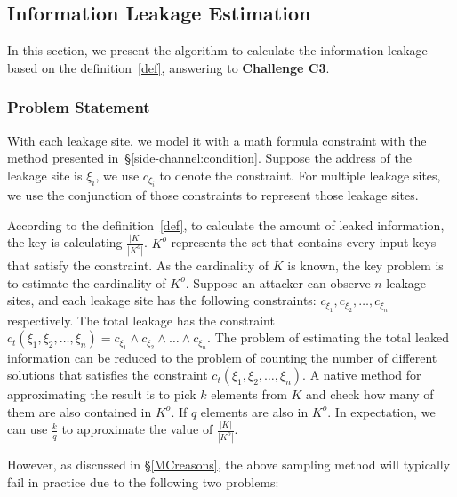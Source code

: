 \subsection{Information Leakage Estimation}

\newcommand{\addr}[1]{{l}_{#1}}
\renewcommand{\addr}[1]{{\gamma}_{#1}}
\renewcommand{\addr}[1]{{\zeta}_{#1}}
\renewcommand{\addr}[1]{{\xi}_{#1}}

In this section, we present the algorithm to calculate the information
leakage based on the definition~\ref{def}, answering to
\textbf{Challenge C3}. 

\subsubsection{Problem Statement}
With each leakage site, we model it with a math formula constraint with the method 
presented in~\S\ref{side-channel:condition}.
Suppose the address of the leakage site is $\addr{i}$,
we use $c_{\addr{i}}$ to denote the constraint. For multiple leakage sites, 
we use the conjunction of those constraints to represent those leakage sites. 

According to the definition~\ref{def}, to calculate the amount of leaked 
information, the key is calculating $\frac{|K|}{|K^o|}$. $K^o$ represents
the set that contains every input keys that satisfy the constraint. As the 
cardinality of $K$ is known, the key problem is to estimate the cardinality of
$K^o$. Suppose an attacker can observe $n$ leakage sites, and each leakage site has
the following constraints: $c_{\addr{1}}, c_{\addr{2}}, \ldots, c_{\addr{n}}$ respectively. 
The total leakage has the constraint 
$c_t({\addr{1}},{\addr{2}},\ldots,{\addr{n}}) = c_{\addr{1}} \land c_{\addr{2}} 
\land \ldots \land c_{\addr{n}}$. The problem of estimating the total leaked information 
can be reduced to the problem of counting the number of different solutions 
that satisfies the constraint $c_t({\addr{1}},{\addr{2}},\ldots,{\addr{n}})$. 
A native method for approximating 
the result is to pick $k$ elements from $K$ and check how many of them are also
contained in $K^o$. If $q$ elements are also in $K^o$. In expectation, we can
use $\frac{k}{q}$ to approximate the value of $\frac{|K|}{|K^o|}$.

However, as discussed in \S\ref{MCreasons},
the above sampling method will typically fail in practice due to the following two problems:

